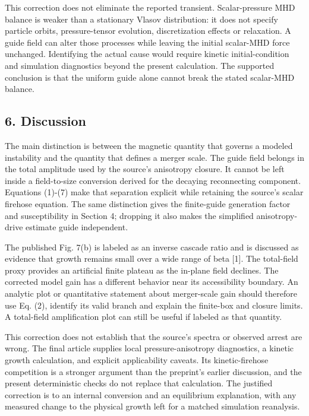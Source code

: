 This correction does not eliminate the reported transient.
Scalar-pressure MHD balance is weaker than a stationary Vlasov
distribution: it does not specify particle orbits, pressure-tensor
evolution, discretization effects or relaxation. A guide field can alter
those processes while leaving the initial scalar-MHD force unchanged.
Identifying the actual cause would require kinetic initial-condition and
simulation diagnostics beyond the present calculation. The supported
conclusion is that the uniform guide alone cannot break the stated
scalar-MHD balance.

\subsection{6. Discussion}\label{discussion}

The main distinction is between the magnetic quantity that governs a
modeled instability and the quantity that defines a merger scale. The
guide field belongs in the total amplitude used by the source's
anisotropy closure. It cannot be left inside a field-to-size conversion
derived for the decaying reconnecting component. Equations (1)-(7) make
that separation explicit while retaining the source's scalar firehose
equation. The same distinction gives the finite-guide generation factor
and susceptibility in Section 4; dropping it also makes the simplified
anisotropy-drive estimate guide independent.

The published Fig. 7(b) is labeled as an inverse cascade ratio and is
discussed as evidence that growth remains small over a wide range of
beta {[}1{]}. The total-field proxy provides an artificial finite
plateau as the in-plane field declines. The corrected model gain has a
different behavior near its accessibility boundary. An analytic plot or
quantitative statement about merger-scale gain should therefore use Eq.
(2), identify its valid branch and explain the finite-box and closure
limits. A total-field amplification plot can still be useful if labeled
as that quantity.

This correction does not establish that the source's spectra or observed
arrest are wrong. The final article supplies local pressure-anisotropy
diagnostics, a kinetic growth calculation, and explicit applicability
caveats. Its kinetic-firehose competition is a stronger argument than
the preprint's earlier discussion, and the present deterministic checks
do not replace that calculation. The justified correction is to an
internal conversion and an equilibrium explanation, with any measured
change to the physical growth left for a matched simulation reanalysis.


